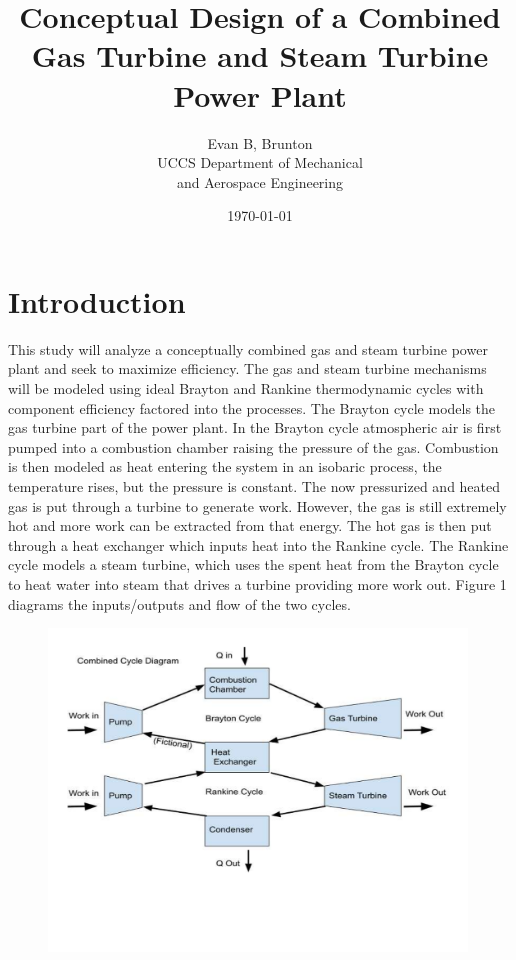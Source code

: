 \documentclass{article}
\title{Conceptual Design of a Combined Gas Turbine and Steam Turbine Power Plant}
\date{\today}
\author{Evan B, Brunton\\[2ex]
    UCCS Department of Mechanical\\
    and Aerospace Engineering
}
\begin{document}
\maketitle

\pagebreak

\section{Introduction}

    This study will analyze a conceptually combined gas and steam turbine power plant and seek to maximize efficiency. The gas and steam turbine mechanisms will be modeled using ideal Brayton and Rankine thermodynamic cycles with component efficiency factored into the processes. The Brayton cycle models the gas turbine part of the power plant. In the Brayton cycle atmospheric air is first pumped into a combustion chamber raising the pressure of the gas. Combustion is then modeled as heat entering the system in an isobaric process, the temperature rises, but the pressure is constant. The now pressurized and heated gas is put through a turbine to generate work. However, the gas is still extremely hot and more work can be extracted from that energy. The hot gas is then put through a heat exchanger which inputs heat into the Rankine cycle. The Rankine cycle models a steam turbine, which uses the spent heat from the Brayton cycle to heat water into steam that drives a turbine providing more work out. Figure 1 diagrams the inputs/outputs and flow of the two cycles.
    
\begin{figure}[!htbp]
\centering
  \includegraphics[page=1,trim=10mm 40mm 10mm 0mm,clip,width=0.99\textwidth]{Combined Cycle Diagram (1).pdf}
  \caption{}
  \label{fig:epsfig}
\end{figure}
\end{document}
